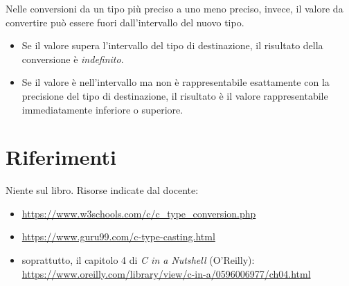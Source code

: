 \documentclass[11pt,a4paper]{article}
\begin{document}
Nelle conversioni da un tipo più preciso a uno meno preciso, invece, il valore da convertire può essere fuori dall'intervallo del nuovo tipo.
\begin{itemize}
    \item Se il valore supera l'intervallo del tipo di destinazione, il risultato della conversione è \emph{indefinito}.
    \item Se il valore è nell'intervallo ma non è rappresentabile esattamente con la precisione del tipo di destinazione, il risultato è il valore rappresentabile immediatamente inferiore o superiore.
\end{itemize}

\section*{Riferimenti}

Niente sul libro. Risorse indicate dal docente:
\begin{itemize}
    \item \url{https://www.w3schools.com/c/c_type_conversion.php}
    \item \url{https://www.guru99.com/c-type-casting.html}
    \item soprattutto, il capitolo 4 di \emph{C in a Nutshell} (O'Reilly):\\
          \url{https://www.oreilly.com/library/view/c-in-a/0596006977/ch04.html}
\end{itemize}
\end{document}
